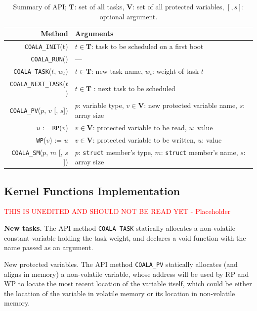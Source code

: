 \begin{table}
\centering
\begin{tabular}{| r | p{} |}
	\hline
	{Method} & {Arguments} \\
	\hline\hline
	\texttt{COALA\_INIT}(t) & $t \in \mathbf{T}$: task to be scheduled on a first boot \\
	\hline
	\texttt{COALA\_RUN}() & --- \\
	\hline
	\texttt{COALA\_TASK}($t$, $w_t$) & $t \in \mathbf{T}$: new task name, $w_t$: weight of task $t$ \\
	\hline
	\texttt{COALA\_NEXT\_TASK}($t$) & $t \in \mathbf{T}$ : next task to be scheduled\\
	\hline
	\texttt{COALA\_PV}($p$, $v$ [, $s$]) & $p$: variable type, $v \in \mathbf{V}$: new protected variable name, $s$: array size\\
	\hline
	$u$ := \texttt{RP}($v$) & $v \in \mathbf{V}$: protected variable to be read, $u$: value \\
	\hline	
	\texttt{WP}($v$) := $u$ &  $v \in \mathbf{V}$: protected variable to be written, $u$: value \\
	\hline
	\texttt{COALA\_SM}($p$, $m$ [, $s$]) & $p$: \texttt{struct} member's type, $m$: \texttt{struct} member's name, $s$: array size \\
	\hline
\end{tabular}
\caption{Summary of \sys API; $\mathbf{T}$: set of all tasks, $\mathbf{V}$: set of all protected variables, $[, s]$: optional argument.}
\label{table:coala_api}
\end{table}

\subsection{\sys Kernel Functions Implementation}

\textcolor{red}{THIS IS UNEDITED AND SHOULD NOT BE READ YET - Placeholder}

\textbf{New tasks.} The API method \texttt{COALA\_TASK} statically allocates a non-volatile constant variable holding the task weight, and declares a void function with the name passed as an argument.

New protected variables. The API method \texttt{COALA\_PV} statically allocates (and aligns in memory) a non-volatile variable, whose address will be used by RP and WP to locate the most recent location of the variable itself, which could be either the location of the variable in volatile memory or its location in non-volatile memory.

